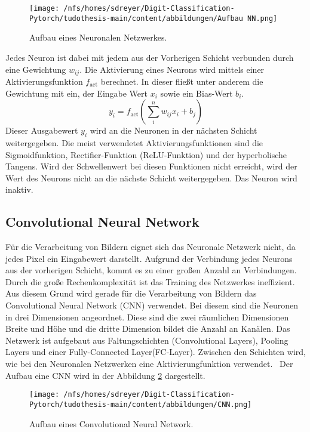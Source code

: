 \begin{figure}[htbp]
  \centering
  \texttt{[image: /nfs/homes/sdreyer/Digit-Classification-Pytorch/tudothesis-main/content/abbildungen/Aufbau NN.png]}
  \caption{Aufbau eines Neuronalen Netzwerkes.~\cite{lecun2015deep}}
  \label{fig:NN}
\end{figure}
Jedes Neuron ist dabei mit jedem aus der Vorherigen Schicht verbunden durch eine Gewichtung $w_{ij}$.
Die Aktivierung eines Neurons wird mittels einer Aktivierungsfunktion $f_\text{act}$ berechnet. In dieser fließt unter anderem die Gewichtung mit 
ein, der Eingabe Wert $x_i$ sowie ein Bias-Wert $b_i$.
\begin{equation}
    y_i = f_\text{act}\left(\sum_{i}^{n} w_{ij}x_i + b_j\right)
\end{equation}
Dieser Ausgabewert $y_i$ wird an die Neuronen in der nächsten Schicht weitergegeben.
Die meist verwendetet Aktivierungsfunktionen sind die Sigmoidfunktion, Rectifier-Funktion (ReLU-Funktion) und der hyperbolische Tangens.
Wird der Schwellenwert bei diesen Funktionen nicht erreicht, wird der Wert des Neurons nicht an die nächste Schicht weitergegeben.
Das Neuron wird inaktiv.~\cite{datascience}

\subsection{Convolutional Neural Network}

Für die Verarbeitung von Bildern eignet sich das Neuronale Netzwerk nicht, da jedes Pixel ein Eingabewert darstellt.
Aufgrund der Verbindung jedes Neurons aus der vorherigen Schicht, kommt es zu einer großen Anzahl an Verbindungen.
Durch die große Rechenkomplexität ist das Training des Netzwerkes ineffizient.
Aus diesem Grund wird gerade für die Verarbeitung von Bildern das Convolutional Neural Network (CNN) verwendet.
Bei diesem sind die Neuronen in drei Dimensionen angeordnet.
Diese sind die zwei räumlichen Dimensionen Breite und Höhe und die dritte Dimension bildet die Anzahl an Kanälen.
Das Netzwerk ist aufgebaut aus Faltungschichten (Convolutional Layers), Pooling Layers und einer Fully-Connected Layer(FC-Layer).
Zwischen den Schichten wird, wie bei den Neuronalen Netzwerken eine Aktivierungfunktion verwendet.~\cite{OShea} 
Der Aufbau eine CNN wird in der Abbildung \ref{fig:CNN} dargestellt.

\begin{figure}[htbp]
  \centering
  \texttt{[image: /nfs/homes/sdreyer/Digit-Classification-Pytorch/tudothesis-main/content/abbildungen/CNN.png]}
  \caption{Aufbau eines Convolutional Neural Network.~\cite{Mohammed2024}}
  \label{fig:CNN}
\end{figure}


